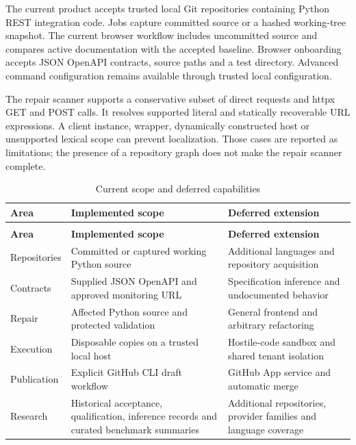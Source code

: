 \documentclass[12pt,a4paper,oneside]{report}
\begin{document}
The current product accepts trusted local Git repositories containing Python REST integration code. Jobs capture committed source or a hashed working-tree snapshot. The current browser workflow includes uncommitted source and compares active documentation with the accepted baseline. Browser onboarding accepts JSON OpenAPI contracts, source paths and a test directory. Advanced command configuration remains available through trusted local configuration.

The repair scanner supports a conservative subset of direct requests and httpx GET and POST calls. It resolves supported literal and statically recoverable URL expressions. A client instance, wrapper, dynamically constructed host or unsupported lexical scope can prevent localization. Those cases are reported as limitations; the presence of a repository graph does not make the repair scanner complete.

\begingroup\normalsize\onehalfspacing\setlength{\tabcolsep}{4pt}\renewcommand{\arraystretch}{1.2}
\begin{longtable}{@{}>{\raggedright\arraybackslash}p{}>{\raggedright\arraybackslash}p{}>{\raggedright\arraybackslash}p{}@{}}
\caption{Current scope and deferred capabilities}\label{tab:1.2}\\
\toprule
\textbf{Area} & \textbf{Implemented scope} & \textbf{Deferred extension}\\\midrule
\endfirsthead
\multicolumn{3}{l}{\small Table 1.2 continued}\\\toprule
\textbf{Area} & \textbf{Implemented scope} & \textbf{Deferred extension}\\\midrule
\endhead
\bottomrule\endfoot
Repositories & Committed or captured working Python source & Additional languages and repository acquisition\\
Contracts & Supplied JSON OpenAPI and approved monitoring URL & Specification inference and undocumented behavior\\
Repair & Affected Python source and protected validation & General frontend and arbitrary refactoring\\
Execution & Disposable copies on a trusted local host & Hostile-code sandbox and shared tenant isolation\\
Publication & Explicit GitHub CLI draft workflow & GitHub App service and automatic merge\\
Research & Historical acceptance, qualification, inference records and curated benchmark summaries & Additional repositories, provider families and language coverage\\
\end{longtable}\endgroup
\end{document}
